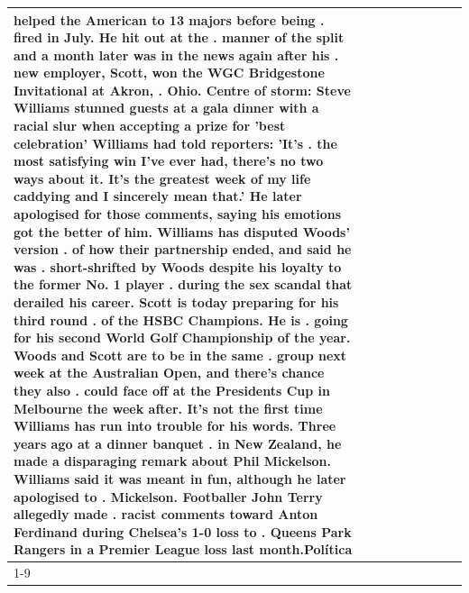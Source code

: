 \begin{table}[H]
\begin{tabular}{lllrlllll}
helped the American to 13 majors before being . fired in July. He hit out at the . manner of the split and a month later was in the news again after his . new employer, Scott, won the WGC Bridgestone Invitational at Akron, . Ohio. Centre of storm: Steve Williams stunned guests at a gala dinner with a racial slur when accepting a prize for 'best celebration' Williams had told reporters: 'It's . the most satisfying win I've ever had, there's no two ways about it. It's the greatest week of my life caddying and I sincerely mean that.' He later apologised for those comments, saying his emotions got the better of him. Williams has disputed Woods' version . of how their partnership ended, and said he was . short-shrifted by Woods despite his loyalty to the former No. 1 player . during the sex scandal that derailed his career. Scott is today preparing for his third round . of the HSBC Champions. He is . going for his second World Golf Championship of the year. Woods and Scott are to be in the same . group next week at the Australian Open, and there's chance they also . could face off at the Presidents Cup in Melbourne the week after. It's not the first time Williams has run into trouble for his words. Three years ago at a dinner banquet . in New Zealand, he made a disparaging remark about Phil Mickelson. Williams said it was meant in fun, although he later apologised to . Mickelson. Footballer John Terry allegedly made . racist comments toward Anton Ferdinand during Chelsea's 1-0 loss to . Queens Park Rangers in a Premier League loss last month.Política \\
\cline{1-9}

\end{tabular}
\end{table}
